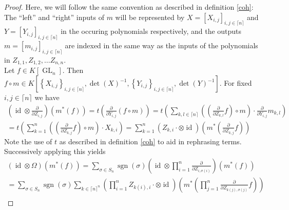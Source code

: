 \begin{proof}
  Here, we will follow the same convention as described in definition \ref{coh}: The ``left'' and ``right'' inputs of $ m $ will be represented by $ X = \left\lbrack X_{i,j} \right\rbrack_{i,j \in \lceil n \rceil} $ and $ Y = \left\lbrack Y_{i,j} \right\rbrack_{i,j \in \lceil n \rceil} $ in the occuring polynomials respectively, and the outputs $ m = \left\lbrack m_{i,j} \right\rbrack_{i,j \in \lceil n \rceil} $ are indexed in the same way as the inputs of the polynomials in $ Z_{1,1} , Z_{1,2} , \ldots Z_{n,n} $.\\
  Let $f \in K \left\lbrack \operatorname{GL}_n \right\rbrack $.
  Then $ f \circ m \in K \left\lbrack \left\{ X_{i,j} \right\}_{i,j \in \lceil n \rceil} , \operatorname{det} \left( X \right)^{-1} , \left\{ Y_{i,j} \right\}_{i,j \in \lceil n \rceil} , \operatorname{det} \left( Y \right)^{-1} \right\rbrack $.
  For fixed $i,j \in \lceil n \rceil $ we have
  \begin{equation}
    \begin{aligned}
    \left( \operatorname{id} \otimes \frac{\partial}{\partial Z_{i,j}} \right) \left( m^\ast \left( f \right) \right) 
    = t \left( \frac{\partial}{\partial Y_{i,j}} \left( f \circ m \right) \right) 
    = t \left( \sum_{k,l \in \lceil n \rceil} \left( \left( \frac{\partial}{\partial Z_{k,l}} f \right) \circ m \right) \cdot \frac{\partial}{\partial Y_{i,j}} m_{k,l} \right) \\
    = t \left( \sum_{k = 1}^n \left( \left( \frac{\partial}{\partial Z_{k,j}} f \right) \circ m \right) \cdot X_{k,i} \right) 
    = \sum_{k=1}^n \left( Z_{k,i} \cdot \otimes \operatorname{id} \right) \left( m^\ast \left( \frac{\partial}{\partial Z_{k,j}} f \right) \right)
    \end{aligned}
  \end{equation}
  Note the use of $ t $ as described in definition \ref{coh} to aid in rephrasing terms.
  Successively applying this yields
  \begin{equation}
    \begin{aligned}
      \left( \operatorname{id} \otimes \Omega \right) \left( m^\ast \left( f \right) \right)
      = \sum_{\sigma \in S_n} \operatorname{sgn} \left( \sigma \right) \left( \operatorname{id} \otimes \prod_{i=1}^n \frac{\partial}{\partial Z_{i,\sigma \left( i \right)}} \right) \left( m^\ast \left( f \right) \right) \\
      = \sum_{\sigma \in S_n} \operatorname{sgn} \left( \sigma \right) \sum_{k \in \lceil n \rceil^n} \left( \prod_{i=1}^n Z_{k(i),i} \cdot \otimes \operatorname{id} \right) \left( m^\ast \left( \prod_{j=1}^n \frac{\partial}{\partial Z_{k(j),\sigma (j)}} f \right) \right) \\

\end{aligned}
\end{equation}
\end{proof}
